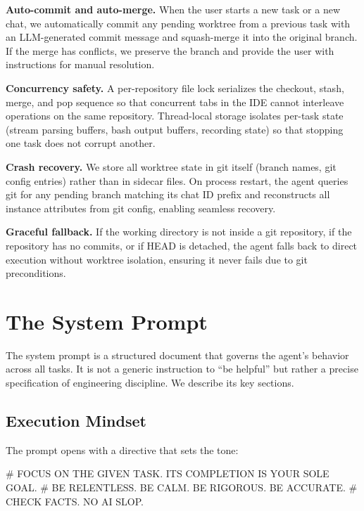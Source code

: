 \documentclass{article}
\begin{document}
\textbf{Auto-commit and auto-merge.}  When the user starts a new task
or a new chat, we automatically commit any pending worktree from a
previous task with an LLM-generated commit message and squash-merge it
into the original branch.  If the merge has conflicts, we preserve the
branch and provide the user with instructions for manual resolution.

\textbf{Concurrency safety.}  A per-repository file lock serializes
the checkout, stash, merge, and pop sequence so that concurrent tabs
in the IDE cannot interleave operations on the same repository.
Thread-local storage isolates per-task state (stream parsing buffers,
bash output buffers, recording state) so that stopping one task does
not corrupt another.

\textbf{Crash recovery.}  We store all worktree state in git itself
(branch names, git config entries) rather than in sidecar files.  On
process restart, the agent queries git for any pending
branch matching its chat ID prefix and reconstructs all instance
attributes from git config, enabling seamless recovery.

\textbf{Graceful fallback.}  If the working directory is not inside a
git repository, if the repository has no commits, or if HEAD is
detached, the agent falls back to direct execution without worktree
isolation, ensuring it never fails due to git preconditions.

\section{The System Prompt}
\label{sec:system-prompt}

The system prompt is a structured document that governs the agent's
behavior across all tasks.  It is not a generic instruction to ``be
helpful'' but rather a precise specification of engineering discipline.
We describe its key sections.

\subsection{Execution Mindset}

The prompt opens with a directive that sets the tone:

\begin{prompt}
# FOCUS ON THE GIVEN TASK. ITS COMPLETION IS YOUR SOLE GOAL.
# BE RELENTLESS. BE CALM. BE RIGOROUS. BE ACCURATE.
# CHECK FACTS. NO AI SLOP.
\end{prompt}
\end{document}
